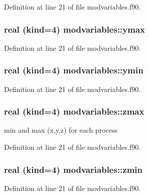 Definition at line 21 of file modvariables.\+f90.

\subsubsection[{\texorpdfstring{ymax}{ymax}}]{\setlength{\rightskip}{0pt plus 5cm}real (kind=4) modvariables\+::ymax}\hypertarget{namespacemodvariables_aa84922c68231d1c3496d3a7d210a62e7}{}\label{namespacemodvariables_aa84922c68231d1c3496d3a7d210a62e7}


Definition at line 21 of file modvariables.\+f90.

\subsubsection[{\texorpdfstring{ymin}{ymin}}]{\setlength{\rightskip}{0pt plus 5cm}real (kind=4) modvariables\+::ymin}\hypertarget{namespacemodvariables_af09b8e9f670d2074a46c55ed90661609}{}\label{namespacemodvariables_af09b8e9f670d2074a46c55ed90661609}


Definition at line 21 of file modvariables.\+f90.

\subsubsection[{\texorpdfstring{zmax}{zmax}}]{\setlength{\rightskip}{0pt plus 5cm}real (kind=4) modvariables\+::zmax}\hypertarget{namespacemodvariables_ab9a39f4e4f686b80011f46a2f88617c1}{}\label{namespacemodvariables_ab9a39f4e4f686b80011f46a2f88617c1}


min and max (x,y,z) for each process 



Definition at line 21 of file modvariables.\+f90.

\subsubsection[{\texorpdfstring{zmin}{zmin}}]{\setlength{\rightskip}{0pt plus 5cm}real (kind=4) modvariables\+::zmin}\hypertarget{namespacemodvariables_aa88314239681eb1c24673391f4612eb3}{}\label{namespacemodvariables_aa88314239681eb1c24673391f4612eb3}


Definition at line 21 of file modvariables.\+f90.

